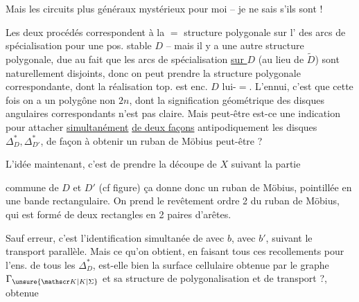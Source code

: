 Mais les circuits plus généraux  mystérieux pour moi -- je ne sais s'ils sont  !

Les deux procédés correspondent à la $=$ structure polygonale sur l' des arcs de spécialisation  pour une pos. stable $D$ -- mais il y a une autre structure polygonale, due au fait que les  arcs de spécialisation \uline{sur $D$} (au lieu de $\widetilde D$) sont naturellement disjoints, donc on peut prendre la structure polygonale correspondante, dont la réalisation top. est enc. $D$ lui-$=$. L'ennui, c'est que cette fois on a un polygône   non $2n$,  dont la signification géométrique des disques angulaires correspondants n'est pas claire. Mais peut-être est-ce une indication pour attacher \uline{simultanément} \uline{de deux façons} antipodiquement les disques $\Delta^*_{D},\Delta^*_{D'}$, de façon à obtenir un ruban de Möbius peut-être ?

L'idée maintenant, c'est de prendre la découpe de $X$ suivant la partie


commune de $D$ et $D'$ (cf figure) ça donne donc un ruban de Möbius,   pointillée en une bande rectangulaire. On prend le revêtement  ordre 2 du ruban de Möbius,  qui est formé de deux rectangles  en 2 paires d'arêtes.

Sauf erreur, c'est l'identification  simultanée de  avec $b$,   avec $b'$, suivant le transport parallèle. Mais ce qu'on obtient, en faisant tous ces recollements pour l'ens. de tous les $\Delta_D^*$, est-elle bien la surface cellulaire obtenue par le graphe $\Gamma_{\unsure{\mathscr K|K|\Sigma}}$ et sa structure de polygonalisation et de transport ?, obtenue
